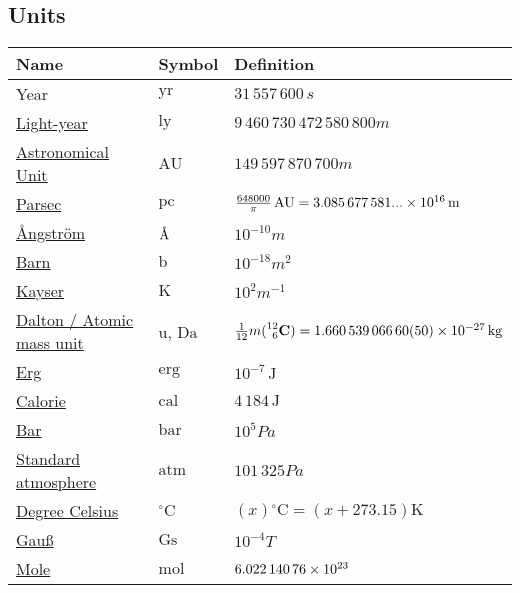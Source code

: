 	\subsection{Units}
		\begin{center}
		\begin{tabular}{| L{.35\textwidth} L{.15\textwidth} L{.4\textwidth} |}
			\hline
			Name & Symbol & Definition \\ \hline \hline
			Year & $\mathrm{yr}$ & $31\,557\,600\,\unit{s}$ \\ \hline
			\href{https://en.wikipedia.org/wiki/Light-year}{Light-year} & $\mathrm{ly}$ & $9\,460\,730\,472\,580\,800\unit{m}$ \\ \hline
			\href{https://en.wikipedia.org/wiki/Astronomical_unit}{Astronomical Unit} & $\mathrm{AU}$ & $149\,597\,870\,700\unit{m}$ \\ \hline 
			\href{https://en.wikipedia.org/wiki/Parsec}{Parsec} & $\mathrm{pc}$ & $\frac{648000}{\pi}\,\mathrm{AU} = 3.085\,677\,581...\times 10^{16}\,\mathrm{m}$ \\ \hline
			\href{https://en.wikipedia.org/wiki/Angstrom}{\r{A}ngström} & ${\mbox{\normalfont\AA}}$ & $10^{-10}\unit{m}$ \\ \hline
			\href{https://en.wikipedia.org/wiki/Barn_(unit)}{Barn} & $\mathrm{b}$ & $10^{-18}\unit{m^2}$ \\ \hline
			\href{https://en.wikipedia.org/wiki/Wavenumber#In_spectroscopy}{Kayser} & $\mathrm{K}$ & $10^2\unit{m^{-1}}$ \\ \hline
			\href{https://en.wikipedia.org/wiki/Dalton_(unit)}{Dalton / Atomic mass unit} & $\mathrm{u}$, $\mathrm{Da}$ & $\frac{1}{12}m(\prescript{12}{6}{\mathbf{C}}) = 1.660\,539\,066\,60(50)\times 10^{-27}\,\mathrm{kg}$ \\ \hline
			\href{https://en.wikipedia.org/wiki/Erg}{Erg} & $\mathrm{erg}$ & $10^{-7}\,\mathrm{J}$ \\ \hline
			\href{https://en.wikipedia.org/wiki/Calorie}{Calorie} & $\mathrm{cal}$ & $4\,184\,\mathrm{J}$ \\ \hline
			\href{https://en.wikipedia.org/wiki/Bar_(unit)}{Bar} & $\mathrm{bar}$ & $10^5\unit{Pa}$ \\ \hline
			\href{https://en.wikipedia.org/wiki/Standard_atmosphere_(unit)}{Standard atmosphere} & $\mathrm{atm}$ & $101\,325\unit{Pa}$ \\ \hline
			\href{https://en.wikipedia.org/wiki/Celsius}{Degree Celsius} & $\mathrm{^\circ C}$ & $(x)\mathrm{^\circ C}=(x+273.15)\mathrm{K}$ \\ \hline
			\href{https://en.wikipedia.org/wiki/Gauss_(unit)}{Gauß} & $\mathrm{Gs}$ & $10^{-4}\unit{T}$ \\ \hline
			\href{https://en.wikipedia.org/wiki/Mole_(unit)}{Mole} & $\mathrm{mol}$ & $6.022\,140\,76\times 10^{23}$ \\ \hline
		\end{tabular}
		\end{center}


